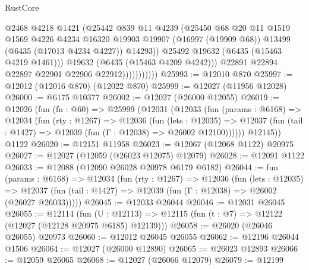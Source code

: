 \begin{lexlean}{RustCore}
\begin{coremodule}
                              @2468
                              @4218
                              @1421
                              (@25442
                                @839
                                @11
                                @4239
                                (@25450
                                  @68
                                  @20
                                  @11
                                  @1519
                                  @1569
                                  @4226
                                  @4234
                                  @16320
                                  @19903
                                  @19907
                                  (@16997 (@19909 @68))
                                  @13499
                                  (@6435 (@17013 @4234 @4227))
                                  @14293))
                              @25492
                              @19632
                              (@6435 (@15463 @4219 @1461)))
                            @19632
                            (@6435 (@15463 @4209 @4242)))
                          @22891
                          @22894
                          @22897
                          @22901
                          @22906
                          @22912)))))))))))
@25993 := @12010 @870
@25997 := @12012 (@12016 @870) (@12022 @870)
@25999 := @12027 (@11956 @12028)
@26000 := @6175 @10377
@26002 := @12027 (@26000 @12055)
@26019 := @12026
    (fun (fn : @60) =>
    @25999
      (@12031
        (@12033
          (fun (params : @6168) =>
          @12034
            (fun (rty : @1267) =>
            @12036
              (fun (lets : @12035) =>
              @12037 (fun (tail : @1427) => @12039 (fun (Γ : @12038) => @26002 @12100))))))
        @12145))
    @1122
@26020 := @12151 @11958
@26023 := @12067 (@12068 @1122) @20975
@26027 := @12027 (@12059 (@26023 @12075) @12079)
@26028 := @12091 @1122
@26033 := @12088 (@12090 @26028 @20978 @6179 @6182)
@26044 := fun (params : @6168) =>
  @12034
    (fun (rty : @1267) =>
    @12036
      (fun (lets : @12035) =>
      @12037 (fun (tail : @1427) => @12039 (fun (Γ : @12038) => @26002 (@26027 @26033)))))
@26045 := @12033 @26044
@26046 := @12031 @26045
@26055 := @12114
    (fun (U : @12113) => @12115 (fun (t : @7) => @12122 (@12027 (@12128 @20975 @6185) @12139)))
@26058 := @26020 (@26046 @26055) @20973
@26060 := @12012 @26045 @26055
@26062 := @12196 @26044 @1506
@26064 := @12027 (@26000 @12890)
@26065 := @26023 @12893
@26066 := @12059 @26065
@26068 := @12027 (@26066 @12079)
@26079 := @12199

\end{coremodule}
\end{lexlean}
